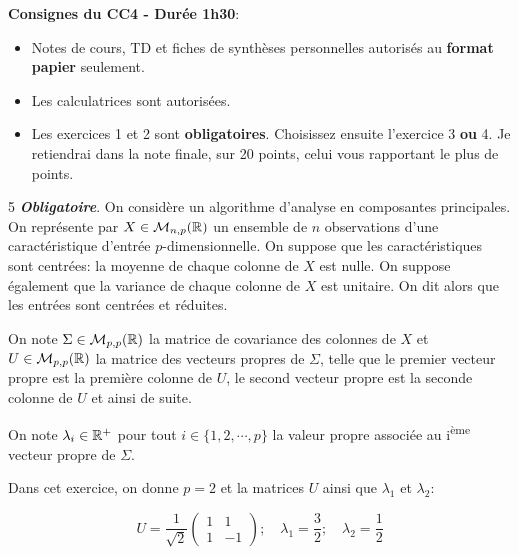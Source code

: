 \documentclass[solutions]{../cc}
\begin{document}
	
	
	\noindent \textbf{Consignes du CC4 - Durée 1h30}:
	\begin{itemize}[nosep]
		\item Notes de cours, TD et fiches de synthèses personnelles autorisés au \textbf{format papier} seulement.
		\item Les calculatrices sont autorisées.
		\item Les exercices 1 et 2 sont \textbf{obligatoires}. Choisissez ensuite l'exercice 3 \textbf{ou} 4. Je retiendrai dans la note finale, sur 20 points, celui vous rapportant le plus de points.
	\end{itemize}
	
	\begin{exopoints}{5}
		\textit{\textbf{Obligatoire}}. On considère un algorithme d'analyse en composantes principales. On représente par $X \in \mathcal{M}_{n,p}(\mathbb{R})$ un ensemble de $n$ observations d'une caractéristique d'entrée $p$-dimensionnelle. On suppose que les caractéristiques sont centrées: la moyenne de chaque colonne de $X$ est nulle. On suppose également que la variance de chaque colonne de $X$ est unitaire. On dit alors que les entrées sont centrées et réduites.
		
		On note $\Sigma \in \mathcal{M}_{p,p}(\mathbb{R})$ la matrice de covariance des colonnes de $X$ et $U \in \mathcal{M}_{p,p}(\mathbb{R})$ la matrice des vecteurs propres de $\Sigma$, telle que le premier vecteur propre est la première colonne de $U$, le second vecteur propre est la seconde colonne de $U$ et ainsi de suite.
		
		On note $\lambda_i \in \mathbb{R}^+$ pour tout $i \in \{1, 2, \cdots, p\}$ la valeur propre associée au i\textsuperscript{ème} vecteur propre de $\Sigma$.
				
		Dans cet exercice, on donne $p = 2$ et la matrices $U$ ainsi que $\lambda_1$ et $\lambda_2$:
		
		\begin{equation*}
			U = \frac{1}{\sqrt{2}}\begin{pmatrix}
					1 & 1 \\
					1 & -1
			\end{pmatrix};
			\quad \lambda_1 = \frac{3}{2};
			\quad \lambda_2 = \frac{1}{2}
		\end{equation*}
		

\end{exopoints}
\end{document}
